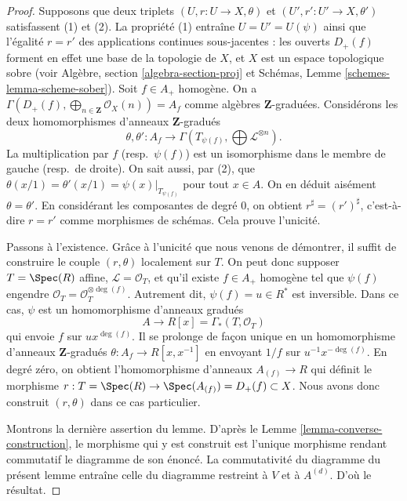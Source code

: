 \begin{proof}
Supposons que deux triplets $(U, r : U \to X, \theta)$ et
$(U', r' : U' \to X, \theta')$ satisfassent (1) et (2).
La propriété (1) entraîne $U = U' = U(\psi)$ ainsi que l'égalité
$r = r'$ des applications continues
sous-jacentes : les ouverts $D_{+}(f)$
forment en effet une base de la topologie de $X$, et $X$ est un espace
topologique sobre (voir Algèbre, section \ref{algebra-section-proj} et
Schémas, Lemme \ref{schemes-lemma-scheme-sober}).
Soit $f \in A_{+}$ homogène. On a
$\Gamma(D_{+}(f), \bigoplus_{n \in \mathbf{Z}} \mathcal{O}_X(n)) = A_f$
comme algèbres $\mathbf{Z}$-graduées.
Considérons les deux homomorphismes
d'anneaux $\mathbf{Z}$-gradués
$$
\theta, \theta' :
A_f
\longrightarrow
\Gamma(T_{\psi(f)}, \bigoplus \mathcal{L}^{\otimes n}).
$$
La multiplication par $f$ (resp.\ $\psi(f)$) est un isomorphisme dans le
membre de gauche (resp.\ de droite). On sait aussi, par (2), que
$\theta(x/1) = \theta'(x/1) = \psi(x)|_{T_{\psi(f)}}$
pour tout $x \in A$.
On en déduit aisément $\theta = \theta'$. En considérant les composantes
de degré $0$, on obtient $r^\sharp = (r')^\sharp$, c'est-à-dire
$r = r'$ comme morphismes de schémas. Cela prouve l'unicité.

\medskip\noindent
Passons à l'existence. Grâce à l'unicité que nous venons de démontrer,
il suffit de construire le couple $(r, \theta)$ localement sur $T$.
On peut donc supposer $T = \Spec(R)$ affine, $\mathcal{L} = \mathcal{O}_T$,
et qu'il existe $f \in A_{+}$ homogène tel que $\psi(f)$ engendre
$\mathcal{O}_T = \mathcal{O}_T^{\otimes \deg(f)}$.
Autrement dit, $\psi(f) = u \in R^*$ est inversible. Dans ce cas, $\psi$
est un homomorphisme d'anneaux gradués
$$
A \longrightarrow R[x] = \Gamma_*(T, \mathcal{O}_T)
$$ qui envoie $f$ sur $ux^{\deg(f)}$. Il se prolonge de façon unique en un
homomorphisme d'anneaux $\mathbf{Z}$-gradués
$\theta : A_f \to R[x, x^{-1}]$ en envoyant $1/f$ sur
$u^{-1}x^{-\deg(f)}$. En degré zéro, on obtient l'homomorphisme d'anneaux
$A_{(f)} \to R$ qui définit le morphisme
$r : T = \Spec(R) \to \Spec(A_{(f)}) = D_{+}(f) \subset X$.
Nous avons donc construit $(r, \theta)$ dans ce cas particulier.

\medskip\noindent
Montrons la dernière assertion du lemme. D'après le
Lemme \ref{lemma-converse-construction},
le morphisme qui y est construit
est l'unique morphisme rendant commutatif le diagramme de son énoncé.
La commutativité du diagramme du présent
lemme entraîne celle du diagramme
restreint à $V$ et à $A^{(d)}$. D'où le résultat.
\end{proof}

